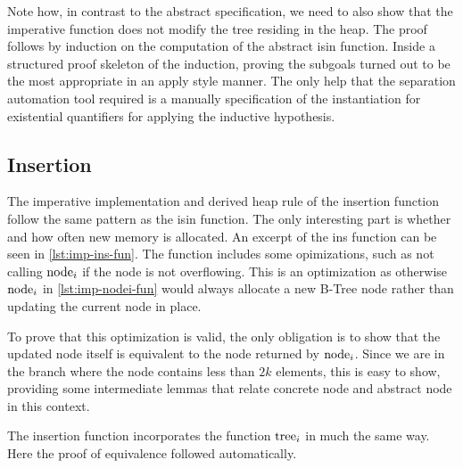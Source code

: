 Note how, in contrast to the abstract specification,
we need to also show that the imperative function does not modify the tree
residing in the heap.
The proof follows by induction on the computation of the abstract isin function.
Inside a structured proof skeleton of the induction,
proving the subgoals turned out to be the most
appropriate in an apply style manner.
The only help that the separation automation tool required
is a manually specification of the instantiation for existential quantifiers
for applying the inductive hypothesis. 

\subsection{Insertion}

The imperative implementation and derived heap rule of the insertion function follow
the same pattern as the isin function.
The only interesting part is whether and how often new memory is allocated.
An excerpt of the ins function can be seen in \autoref{lst:imp-ins-fun}.
The function includes some opimizations, such as not calling
$\operatorname{node}_i$ if the node is not overflowing.
This is an optimization as otherwise $\operatorname{node}_i$ in
\autoref{lst:imp-nodei-fun} would always allocate a new B-Tree node
rather than updating the current node in place.

To prove that this optimization is valid, the only obligation
is to show that the updated node itself is equivalent
to the node returned by $\operatorname{node}_i$.
Since we are in the branch where the node contains less than $2k$
elements, this is easy to show, providing some intermediate lemmas
that relate concrete node and abstract node in this context.

The insertion function incorporates the function $\operatorname{tree}_i$
in much the same way.
Here the proof of equivalence followed automatically.

